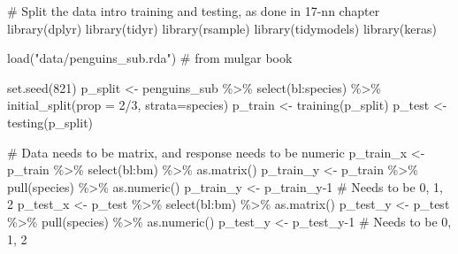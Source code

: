 \documentclass[
  letterpaper,
]{krantz}
\newenvironment{Shaded}{\begin{snugshade}}{\end{snugshade}}
\newcommand{\AttributeTok}[1]{\textcolor[rgb]{0.40,0.45,0.13}{#1}}
\newcommand{\CommentTok}[1]{\textcolor[rgb]{0.37,0.37,0.37}{#1}}
\newcommand{\DecValTok}[1]{\textcolor[rgb]{0.68,0.00,0.00}{#1}}
\newcommand{\FunctionTok}[1]{\textcolor[rgb]{0.28,0.35,0.67}{#1}}
\newcommand{\NormalTok}[1]{\textcolor[rgb]{0.00,0.23,0.31}{#1}}
\newcommand{\OtherTok}[1]{\textcolor[rgb]{0.00,0.23,0.31}{#1}}
\newcommand{\SpecialCharTok}[1]{\textcolor[rgb]{0.37,0.37,0.37}{#1}}
\newcommand{\StringTok}[1]{\textcolor[rgb]{0.13,0.47,0.30}{#1}}
\begin{document}
\begin{Shaded}
\begin{Highlighting}[]
\CommentTok{\# Split the data intro training and testing, as done in 17{-}nn chapter}
\FunctionTok{library}\NormalTok{(dplyr)}
\FunctionTok{library}\NormalTok{(tidyr)}
\FunctionTok{library}\NormalTok{(rsample)}
\FunctionTok{library}\NormalTok{(tidymodels)}
\FunctionTok{library}\NormalTok{(keras)}

\FunctionTok{load}\NormalTok{(}\StringTok{"data/penguins\_sub.rda"}\NormalTok{) }\CommentTok{\# from mulgar book}

\FunctionTok{set.seed}\NormalTok{(}\DecValTok{821}\NormalTok{)}
\NormalTok{p\_split }\OtherTok{\textless{}{-}}\NormalTok{ penguins\_sub }\SpecialCharTok{\%\textgreater{}\%} 
  \FunctionTok{select}\NormalTok{(bl}\SpecialCharTok{:}\NormalTok{species) }\SpecialCharTok{\%\textgreater{}\%}
  \FunctionTok{initial\_split}\NormalTok{(}\AttributeTok{prop =} \DecValTok{2}\SpecialCharTok{/}\DecValTok{3}\NormalTok{, }
                \AttributeTok{strata=}\NormalTok{species)}
\NormalTok{p\_train }\OtherTok{\textless{}{-}} \FunctionTok{training}\NormalTok{(p\_split)}
\NormalTok{p\_test }\OtherTok{\textless{}{-}} \FunctionTok{testing}\NormalTok{(p\_split)}

\CommentTok{\# Data needs to be matrix, and response needs to be numeric}
\NormalTok{p\_train\_x }\OtherTok{\textless{}{-}}\NormalTok{ p\_train }\SpecialCharTok{\%\textgreater{}\%}
  \FunctionTok{select}\NormalTok{(bl}\SpecialCharTok{:}\NormalTok{bm) }\SpecialCharTok{\%\textgreater{}\%}
  \FunctionTok{as.matrix}\NormalTok{()}
\NormalTok{p\_train\_y }\OtherTok{\textless{}{-}}\NormalTok{ p\_train }\SpecialCharTok{\%\textgreater{}\%} \FunctionTok{pull}\NormalTok{(species) }\SpecialCharTok{\%\textgreater{}\%} \FunctionTok{as.numeric}\NormalTok{() }
\NormalTok{p\_train\_y }\OtherTok{\textless{}{-}}\NormalTok{ p\_train\_y}\DecValTok{{-}1} \CommentTok{\# Needs to be 0, 1, 2}
\NormalTok{p\_test\_x }\OtherTok{\textless{}{-}}\NormalTok{ p\_test }\SpecialCharTok{\%\textgreater{}\%}
  \FunctionTok{select}\NormalTok{(bl}\SpecialCharTok{:}\NormalTok{bm) }\SpecialCharTok{\%\textgreater{}\%}
  \FunctionTok{as.matrix}\NormalTok{()}
\NormalTok{p\_test\_y }\OtherTok{\textless{}{-}}\NormalTok{ p\_test }\SpecialCharTok{\%\textgreater{}\%} \FunctionTok{pull}\NormalTok{(species) }\SpecialCharTok{\%\textgreater{}\%} \FunctionTok{as.numeric}\NormalTok{() }
\NormalTok{p\_test\_y }\OtherTok{\textless{}{-}}\NormalTok{ p\_test\_y}\DecValTok{{-}1} \CommentTok{\# Needs to be 0, 1, 2}


\end{Highlighting}
\end{Shaded}
\end{document}
